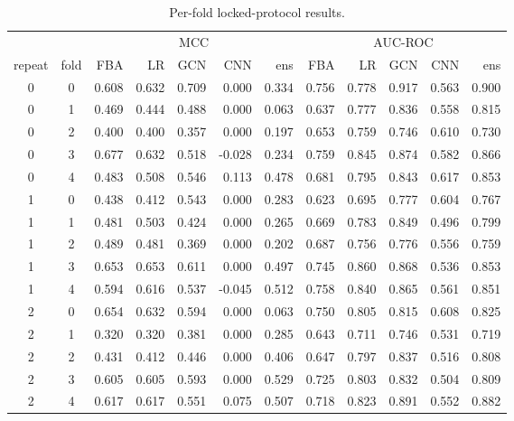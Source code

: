 \begin{longtable}{cc rrrrr rrrrr}
\caption{Per-fold locked-protocol results.}\label{tab:folds}\\
\hline\hline
 & & \multicolumn{5}{c}{MCC} & \multicolumn{5}{c}{AUC-ROC}\\
repeat & fold & FBA & LR & GCN & CNN & ens & FBA & LR & GCN & CNN & ens\\
\hline
0 & 0 & 0.608 & 0.632 & 0.709 & 0.000 & 0.334 & 0.756 & 0.778 & 0.917 & 0.563 & 0.900\\
0 & 1 & 0.469 & 0.444 & 0.488 & 0.000 & 0.063 & 0.637 & 0.777 & 0.836 & 0.558 & 0.815\\
0 & 2 & 0.400 & 0.400 & 0.357 & 0.000 & 0.197 & 0.653 & 0.759 & 0.746 & 0.610 & 0.730\\
0 & 3 & 0.677 & 0.632 & 0.518 & -0.028 & 0.234 & 0.759 & 0.845 & 0.874 & 0.582 & 0.866\\
0 & 4 & 0.483 & 0.508 & 0.546 & 0.113 & 0.478 & 0.681 & 0.795 & 0.843 & 0.617 & 0.853\\
1 & 0 & 0.438 & 0.412 & 0.543 & 0.000 & 0.283 & 0.623 & 0.695 & 0.777 & 0.604 & 0.767\\
1 & 1 & 0.481 & 0.503 & 0.424 & 0.000 & 0.265 & 0.669 & 0.783 & 0.849 & 0.496 & 0.799\\
1 & 2 & 0.489 & 0.481 & 0.369 & 0.000 & 0.202 & 0.687 & 0.756 & 0.776 & 0.556 & 0.759\\
1 & 3 & 0.653 & 0.653 & 0.611 & 0.000 & 0.497 & 0.745 & 0.860 & 0.868 & 0.536 & 0.853\\
1 & 4 & 0.594 & 0.616 & 0.537 & -0.045 & 0.512 & 0.758 & 0.840 & 0.865 & 0.561 & 0.851\\
2 & 0 & 0.654 & 0.632 & 0.594 & 0.000 & 0.063 & 0.750 & 0.805 & 0.815 & 0.608 & 0.825\\
2 & 1 & 0.320 & 0.320 & 0.381 & 0.000 & 0.285 & 0.643 & 0.711 & 0.746 & 0.531 & 0.719\\
2 & 2 & 0.431 & 0.412 & 0.446 & 0.000 & 0.406 & 0.647 & 0.797 & 0.837 & 0.516 & 0.808\\
2 & 3 & 0.605 & 0.605 & 0.593 & 0.000 & 0.529 & 0.725 & 0.803 & 0.832 & 0.504 & 0.809\\
2 & 4 & 0.617 & 0.617 & 0.551 & 0.075 & 0.507 & 0.718 & 0.823 & 0.891 & 0.552 & 0.882\\
\hline
\end{longtable}
